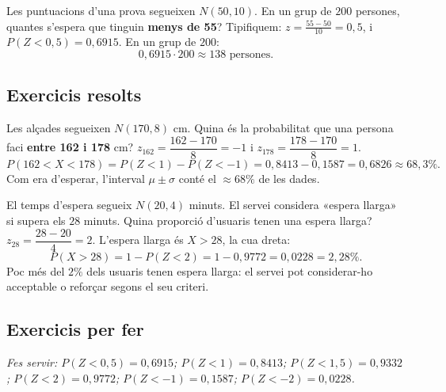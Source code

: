 \begin{exemple}
Les puntuacions d'una prova segueixen $N(50,10)$. En un grup de $200$ persones, quantes
s'espera que tinguin \textbf{menys de 55}? Tipifiquem: $z=\frac{55-50}{10}=0,5$, i
$P(Z<0,5)=0,6915$. En un grup de $200$:
\[
0,6915\cdot 200\approx 138 \text{ persones}.
\]
\end{exemple}

\subsection{Exercicis resolts}

\begin{exresolt}
Les alçades segueixen $N(170,8)$ cm. Quina és la probabilitat que una persona faci
\textbf{entre 162 i 178} cm?
\solucio
$z_{162}=\dfrac{162-170}{8}=-1$ i $z_{178}=\dfrac{178-170}{8}=1$.
\[
P(162<X<178)=P(Z<1)-P(Z<-1)=0,8413-0,1587=0,6826\approx 68,3\%.
\]
Com era d'esperar, l'interval $\mu\pm\sigma$ conté el $\approx 68\%$ de les dades.
\end{exresolt}

\begin{exresolt}
El temps d'espera segueix $N(20,4)$ minuts. El servei considera «espera llarga» si supera
els $28$ minuts. Quina proporció d'usuaris tenen una espera llarga?
\solucio
$z_{28}=\dfrac{28-20}{4}=2$. L'espera llarga és $X>28$, la cua dreta:
\[
P(X>28)=1-P(Z<2)=1-0,9772=0,0228=2,28\%.
\]
Poc més del $2\%$ dels usuaris tenen espera llarga: el servei pot considerar-ho acceptable
o reforçar segons el seu criteri.
\end{exresolt}

\subsection{Exercicis per fer}

\noindent\textit{Fes servir: $P(Z<0,5)=0,6915$; $P(Z<1)=0,8413$; $P(Z<1,5)=0,9332$;
$P(Z<2)=0,9772$; $P(Z<-1)=0,1587$; $P(Z<-2)=0,0228$.}

